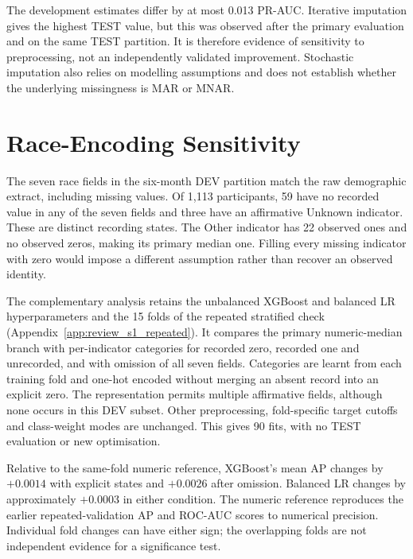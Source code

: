 The development estimates differ by at most 0.013 PR-AUC. Iterative imputation gives the highest TEST value, but this was observed after the primary evaluation and on the same TEST partition. It is therefore evidence of sensitivity to preprocessing, not an independently validated improvement. Stochastic imputation also relies on modelling assumptions and does not establish whether the underlying missingness is \gls{MAR} or \gls{MNAR}.


\section{Race-Encoding Sensitivity}
\label{app:review_s1_race}

The seven race fields in the six-month DEV partition match the raw demographic extract, including missing values. Of 1,113 participants, 59 have no recorded value in any of the seven fields and three have an affirmative Unknown indicator. These are distinct recording states. The Other indicator has 22 observed ones and no observed zeros, making its primary median one. Filling every missing indicator with zero would impose a different assumption rather than recover an observed identity.

The complementary analysis retains the unbalanced XGBoost and balanced LR hyperparameters and the 15 folds of the repeated stratified check (Appendix~\ref{app:review_s1_repeated}). It compares the primary numeric-median branch with per-indicator categories for recorded zero, recorded one and unrecorded, and with omission of all seven fields. Categories are learnt from each training fold and one-hot encoded without merging an absent record into an explicit zero. The representation permits multiple affirmative fields, although none occurs in this DEV subset. Other preprocessing, fold-specific target cutoffs and class-weight modes are unchanged. This gives 90 fits, with no TEST evaluation or new optimisation.



Relative to the same-fold numeric reference, XGBoost's mean AP changes by $+0.0014$ with explicit states and $+0.0026$ after omission. Balanced LR changes by approximately $+0.0003$ in either condition. The numeric reference reproduces the earlier repeated-validation AP and ROC-AUC scores to numerical precision. Individual fold changes can have either sign; the overlapping folds are not independent evidence for a significance test.

